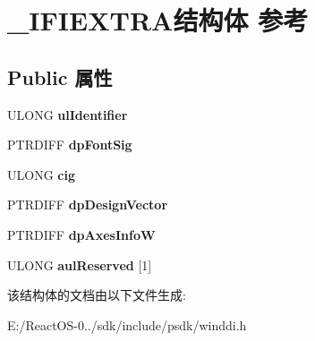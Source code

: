 \hypertarget{struct___i_f_i_e_x_t_r_a}{}\section{\+\_\+\+I\+F\+I\+E\+X\+T\+R\+A结构体 参考}
\label{struct___i_f_i_e_x_t_r_a}
\subsection*{Public 属性}
\begin{DoxyCompactItemize}
\item 
\mbox{\label{struct___i_f_i_e_x_t_r_a_a1cee091e960dd18c1858b3a699c2e41d}} 
U\+L\+O\+NG {\bfseries ul\+Identifier}
\item 
\mbox{\label{struct___i_f_i_e_x_t_r_a_aa90c21b98f0dfd4ff463af025808b215}} 
P\+T\+R\+D\+I\+FF {\bfseries dp\+Font\+Sig}
\item 
\mbox{\label{struct___i_f_i_e_x_t_r_a_aec019f3b5624401287c9bb27fdf59e12}} 
U\+L\+O\+NG {\bfseries cig}
\item 
\mbox{\label{struct___i_f_i_e_x_t_r_a_ab5bc38c9ccc6008804c11fd2e2d1aa53}} 
P\+T\+R\+D\+I\+FF {\bfseries dp\+Design\+Vector}
\item 
\mbox{\label{struct___i_f_i_e_x_t_r_a_ae67c5d0548ef977e476e7ab935cb9c84}} 
P\+T\+R\+D\+I\+FF {\bfseries dp\+Axes\+InfoW}
\item 
\mbox{\label{struct___i_f_i_e_x_t_r_a_acf16290b182522041e8d46103715f321}} 
U\+L\+O\+NG {\bfseries aul\+Reserved} \mbox{[}1\mbox{]}
\end{DoxyCompactItemize}


该结构体的文档由以下文件生成\+:\begin{DoxyCompactItemize}
\item 
E\+:/\+React\+O\+S-\/0../sdk/include/psdk/winddi.\+h\end{DoxyCompactItemize}
